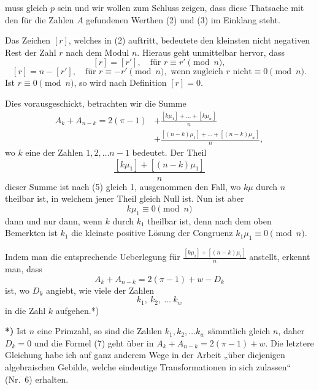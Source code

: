 \documentclass{article}
\begin{document}
muss gleich $p$ sein und wir wollen zum Schluss zeigen, dass diese Thatsache mit den für die Zahlen $A$ gefundenen Werthen (2) und (3) im Einklang steht.

Das Zeichen $[r]$, welches in (2) auftritt, bedeutete den kleinsten nicht negativen Rest der Zahl $r$ nach dem Modul $n$. Hieraus geht unmittelbar hervor, dass
\[
[r] = [r'], \quad \text{für } r \equiv r' \pmod n, \tag{4}
\]
\[
[r] = n - [r'], \quad \text{für } r \equiv -r' \pmod n, \text{ wenn zugleich } r \text{ nicht} \equiv 0 \pmod n. \tag{5}
\]
Ist $r \equiv 0 \pmod n$, so wird nach Definition $[r] = 0$.

Dies vorausgeschickt, betrachten wir die Summe
\[
\begin{aligned}
A_k + A_{n-k} = 2(\pi - 1) &+ \frac{[k\mu_1] + \dots + [k\mu_w]}{n} \\
&+ \frac{[(n-k)\mu_1] + \dots + [(n-k)\mu_w]}{n},
\end{aligned} \tag{6}
\]
wo $k$ eine der Zahlen $1, 2, \dots n-1$ bedeutet. Der Theil
\[
\frac{[k\mu_1] + [(n-k)\mu_1]}{n}
\]
dieser Summe ist nach (5) gleich 1, ausgenommen den Fall, wo $k\mu$ durch $n$ theilbar ist, in welchem jener Theil gleich Null ist. Nun ist aber
\[
k\mu_1 \equiv 0 \pmod n
\]
dann und nur dann, wenn $k$ durch $k_1$ theilbar ist, denn nach dem oben Bemerkten ist $k_1$ die kleinste positive Lösung der Congruenz $k_1\mu_1 \equiv 0 \pmod n$.

Indem man die entsprechende Ueberlegung für $\frac{[k\mu_i] + [(n-k)\mu_i]}{n}$ anstellt, erkennt man, dass
\[
A_k + A_{n-k} = 2(\pi - 1) + w - D_k \tag{7}
\]
ist, wo $D_k$ angiebt, wie viele der Zahlen
\[
k_1, \ k_2, \ \dots \ k_w
\]
in die Zahl $k$ aufgehen.*)

\textbf{*)} Ist $n$ eine Primzahl, so sind die Zahlen $k_1, k_2, \dots k_w$ sämmtlich gleich $n$, daher $D_k = 0$ und die Formel (7) geht über in $A_k + A_{n-k} = 2(\pi - 1) + w$. Die letztere Gleichung habe ich auf ganz anderem Wege in der Arbeit „über diejenigen algebraischen Gebilde, welche eindeutige Transformationen in sich zulassen“ (Nr.~6) erhalten.
\end{document}
